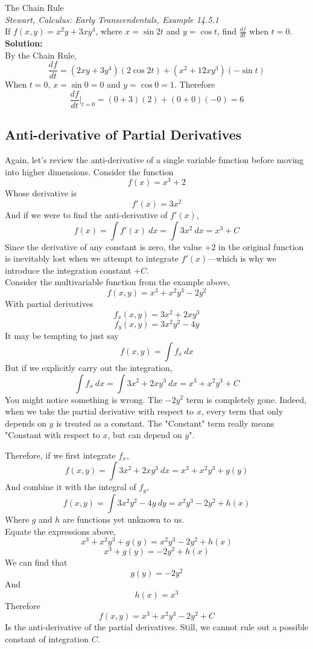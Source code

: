 \documentclass[11pt]{article}
\theoremstyle{gangnamstyle}{\newtheorem{definition}{Definition}[]}
\theoremstyle{gangnamstyle}{\newtheorem{example}{Example}[]}
\theoremstyle{gangnamstyle}{\newtheorem{problem}{Problem}[]}
\begin{document}
\begin{example}
The Chain Rule \\
\textit{Stewart, Calculus: Early Transcendentals, Example 14.5.1} \\
If $f(x, y) = x^2y + 3xy^4$, where $x = \sin 2t$ and $y = \cos t$, find $\frac{df}{dt}$ when $t = 0$. \\

\textbf{Solution:} \\
By the Chain Rule, 
\[ \frac{df}{dt} = (2xy + 3y^4)(2\cos 2t) + (x^2 + 12xy^3)(-\sin t) \]
When $t = 0$, $x = \sin 0 = 0$ and $y = \cos 0 = 1$. Therefore
\[ \frac{df}{dt} \Big|_{t = 0} = (0 + 3)(2) + (0 + 0)(-0) = 6 \]
\end{example}

\subsection{Anti-derivative of Partial Derivatives}

Again, let's review the anti-derivative of a single variable function before moving into higher dimensions. Consider the function
\[ f(x) = x^3 + 2 \]
Whose derivative is 
\[ f'(x) = 3x^2 \]
And if we were to find the anti-derivative of $f'(x)$, 
\[ f(x) = \int f'(x) \ dx = \int 3x^2 \ dx = x^3 + C \]
Since the derivative of any constant is zero, the value $+2$ in the original function is inevitably lost when we attempt to integrate $f'(x)$---which is why we introduce the integration constant $+C$. \\

Consider the multivariable function from the example above,
\[ f(x, y) = x^3 + x^2 y^3 - 2y^2 \]
With partial derivatives
\[ f_x(x, y) = 3x^2 + 2xy^3 \]
\[ f_y(x, y) = 3x^2y^2 - 4y \]
It may be tempting to just say
\[ f(x, y) = \int f_x \ dx \]
But if we explicitly carry out the integration, 
\[ \int f_x \ dx = \int 3x^2 + 2xy^3 \ dx = x^3 + x^2y^3 + C \]
You might notice something is wrong. The $-2y^2$ term is completely gone. Indeed, when we take the partial derivative with respect to $x$, every term that only depends on $y$ is treated as a constant. The "Constant" term really means "Constant with respect to $x$, but can depend on $y$". 

Therefore, if we first integrate $f_x$,
\[ f(x, y) = \int 3x^2 + 2xy^3 \ dx = x^3 + x^2y^3 + g(y) \]
And combine it with the integral of $f_y$, 
\[ f(x, y) = \int 3x^2y^2 - 4y \ dy = x^2y^3 - 2y^2 + h(x) \]
Where $g$ and $h$ are functions yet unknown to us. \\
Equate the expressions above, 
\[ x^3 + x^2y^3 + g(y) = x^2y^3 - 2y^2 + h(x) \]
\[ x^3 + g(y) = - 2y^2 + h(x) \]
We can find that
\[ g(y) = -2y^2 \]
And
\[ h(x) = x^3 \]
Therefore
\[ f(x, y) = x^3 + x^2y^3 - 2y^2 + C \]
Is the anti-derivative of the partial derivatives. Still, we cannot rule out a possible constant of integration $C$. 
\end{document}
